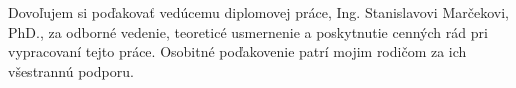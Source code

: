 Dovoľujem si poďakovať vedúcemu diplomovej práce, Ing. Stanislavovi Marčekovi, PhD., za odborné vedenie, teoreticé usmernenie a poskytnutie cenných rád pri vypracovaní tejto práce.
Osobitné poďakovenie patrí mojim rodičom za ich všestrannú podporu.